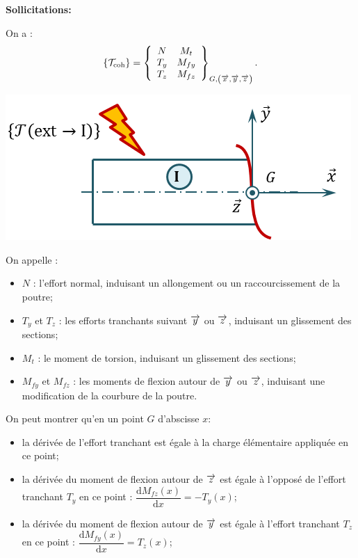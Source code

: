 \documentclass[10pt,fleqn]{article} %
\begin{document}
\begin{defi}
\textbf{Sollicitations:} ~\\

\begin{minipage}[c]{.65\linewidth}
On a : 
$$
\{\mathcal{T}_{\text{coh}}\} = \torseurcol{N}{T_y}{T_z}{M_t}{M_{fy}}{M_{fz}}{G,\left(\vx{}, \vy{}, \vz{} \right)}.
$$
\end{minipage} \hfill
\begin{minipage}[c]{.3\linewidth}
\begin{center}
\includegraphics[width=\linewidth]{images/sollicitations}
\end{center}
\end{minipage}

On appelle :
\begin{itemize}
\item $N$ : l'effort normal, induisant un allongement ou un raccourcissement de la poutre;
\item $T_y$ et $T_z$ : les efforts tranchants suivant $\vy{}$ ou $\vz{}$, induisant un glissement des sections;
\item $M_{t}$ : le moment de torsion, induisant un glissement des sections; 
\item $M_{fy}$ et $M_{fz}$ : les moments de flexion autour de $\vy{}$ ou $\vz{}$, induisant une modification de la courbure de la poutre.
\end{itemize}

\end{defi}


\begin{rem}
On peut montrer qu'en un point $G$ d'abscisse $x$:
\begin{itemize}
\item la dérivée de l'effort tranchant est égale à la charge élémentaire appliquée en ce point;
\item la dérivée du moment de flexion autour de $\vect{z}$ est égale à l'opposé de l'effort tranchant $T_y$ en ce point : $\dfrac{\text{d}M_{fz}(x)}{\text{d}x}=-T_y(x)$;
\item la dérivée du moment de flexion autour de $\vect{y}$ est égale à l'effort tranchant $T_z$ en ce point : $\dfrac{\text{d}M_{fy}(x)}{\text{d}x}=T_z(x)$;
\end{itemize}
\end{rem}
\end{document}
